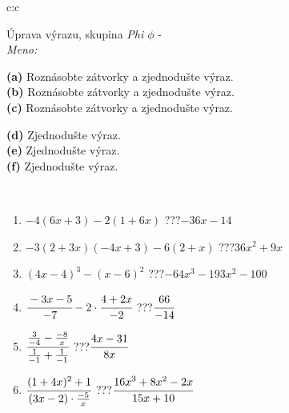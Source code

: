 \documentclass[10pt]{report}
\begin{document}
\newpage
\thispagestyle{empty}
\begin{tabular}{c:c}
\begin{minipage}[c][104.5mm][t]{0.5\linewidth}
\begin{center}
\vspace{7mm}
{\huge Úprava výrazu, skupina \textit{Phi $\phi$} -}\\[5mm]
\textit{Meno:}\phantom{xxxxxxxxxxxxxxxxxxxxxxxxxxxxxxxxxxxxxxxxxxxxxxxxxxxxxxxxxxxxxxxxx}\\[5mm]
\begin{minipage}{0.95\linewidth}
\begin{center}
{\small \begin{minipage}{0.6\textwidth}
\textbf{(a)} Roznásobte zátvorky a zjednodušte výraz. \\[1mm]
\textbf{(b)} Roznásobte zátvorky a zjednodušte výraz. \\[1mm]
\textbf{(c)} Roznásobte zátvorky a zjednodušte výraz.
\end{minipage} \begin{minipage}{0.39\textwidth}
\textbf{(d)} Zjednodušte výraz. \\[1mm]
\textbf{(e)} Zjednodušte výraz. \\[1mm]
\textbf{(f)} Zjednodušte výraz.
\end{minipage}
}
\end{center}
\end{minipage}
\\[4mm]
\begin{minipage}{0.79\linewidth}
\begin{center}
\begin{varwidth}{\linewidth}
\begin{enumerate}
\normalsize
\item $-4(6x+3)-2(1+6x)$\quad \dotfill\; ???\;\dotfill \quad $-36x-14$
\item $-3(2+3x)(-4x+3)-6(2+x)$\quad \dotfill\; ???\;\dotfill \quad $36x^2+9x$
\item $(4x-4)^3-(x-6)^2$\quad \dotfill\; ???\;\dotfill \quad $-64x^3-193x^2-100$
\item $\cfrac{-3x-5}{-7}-2\cdot\cfrac{4+2x}{-2}$\quad \dotfill\; ???\;\dotfill \quad $\cfrac{66}{-14}$
\item $\cfrac{\frac{3}{-4}-\frac{-8}{x}}{\frac{1}{-1}+\frac{1}{-1}}$\quad \dotfill\; ???\;\dotfill \quad $\cfrac{4x-31}{8x}$
\item $\cfrac{(1+4x)^2+1}{(3x-2)\cdot\frac{-5}{x}}$\quad \dotfill\; ???\;\dotfill \quad $\cfrac{16x^3+8x^2-2x}{15x+10}$

\end{enumerate}
\end{varwidth}
\end{center}
\end{minipage}
\end{center}
\end{minipage}
\end{tabular}
\end{document}
